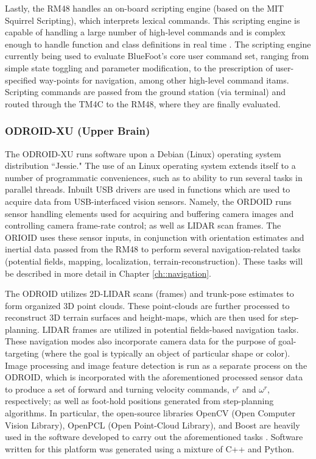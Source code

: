 			Lastly, the RM48 handles an on-board scripting engine (based on the MIT Squirrel Scripting), which interprets lexical commands. This scripting engine is capable of handling a large number of high-level commands and is complex enough to handle function and class definitions in real time \cite{Squirrel_website}. The scripting engine currently being used to evaluate BlueFoot's core user command set, ranging from simple state toggling and parameter modification, to the prescription of user-specified way-points for navigation, among other high-level command itams. Scripting commands are passed from the ground station (via terminal) and routed through the TM4C to the RM48, where they are finally evaluated.

		\subsubsection{ODROID-XU (Upper Brain)}

			The ODROID-XU runs software upon a Debian (Linux) operating system distribution ``Jessie." The use of an Linux operating system extends itself to a number of programmatic conveniences, such as to ability to run several tasks in parallel threads. Inbuilt USB drivers are used in functions which are used to acquire data from USB-interfaced vision sensors. Namely, the ORDOID runs sensor handling elements used for acquiring and buffering camera images and controlling camera frame-rate control; as well as LIDAR scan frames. The ORIOID uses these sensor inputs, in conjunction with orientation estimates and inertial data passed from the RM48 to perform several navigation-related tasks (\EG potential fields, mapping, localization, terrain-reconstruction). These tasks will be described in more detail in Chapter \ref{ch::navigation}.

			The ODROID utilizes 2D-LIDAR scans (frames) and trunk-pose estimates to form organized 3D point clouds. These point-clouds are further processed to reconstruct 3D terrain surfaces and height-maps, which are then used for step-planning. LIDAR frames are utilized in potential fields-based navigation tasks. These navigation modes also incorporate camera data for the purpose of goal-targeting (where the goal is typically an object of particular shape or color). Image processing and image feature detection is run as a separate process on the ODROID, which is incorporated with the aforementioned processed sensor data to produce a set of forward and turning velocity commands, $v^{r}$ and $\omega^{r}$, respectively; as well as foot-hold positions generated from step-planning algorithms. In particular, the open-source libraries OpenCV (Open Computer Vision Library), OpenPCL (Open Point-Cloud Library), and Boost are heavily used in the software developed to carry out the aforementioned tasks \cite{opencv_library,openpcl_library,boost_website}. Software written for this platform was generated using a mixture of C++ and Python.

